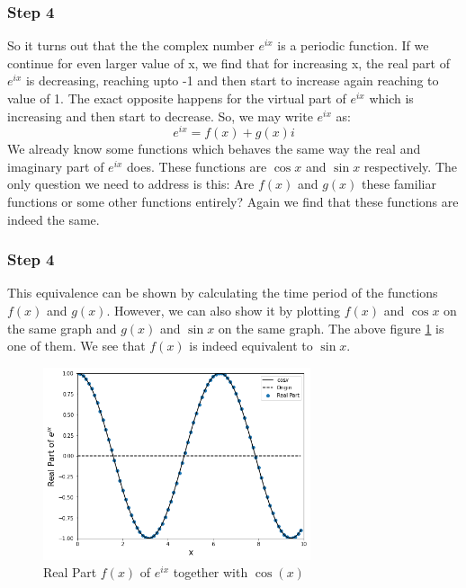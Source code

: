\documentclass{beamer}
\begin{document}
\begin{frame}
    \frametitle{Step 4}
    So it turns out that the the complex number $e^{ix}$ is a periodic function. If we continue for even larger value of x, we find that for increasing x, the real part of $e^{ix}$ is decreasing, reaching upto -1 and then start to increase again reaching to value of 1. The exact opposite happens for the virtual part of $e^{ix}$ which is increasing and then start to decrease.
    So, we may write $e^{ix}$ as: 
    \begin{equation}
        \label{eq:9}
        e^{ix} = f(x) + g(x)i
    \end{equation}
    \pause
    We already know some functions which behaves the same way the real and imaginary part of $e^{ix}$ does. These functions are $\cos{x}$ and $\sin{x}$ respectively. The only question we need to address is this: Are $f(x)$ and $g(x)$ these familiar functions or some other functions entirely? Again we find that these functions are indeed the same.
\end{frame}

\begin{frame}
    \frametitle{Step 4}
    This equivalence can be shown by calculating the time period of the functions $f(x)$ and $g(x)$. However, we can also show it by plotting $f(x)$ and $\cos{x}$ on the same graph and $g(x)$ and $\sin{x}$ on the same graph. The above figure \ref{fig:real} is one of them.
    We see that $f(x)$ is indeed equivalent to $\sin{x}$.
    \pause
    \begin{figure}
        \centering
        \includegraphics[width=0.7\textwidth, height=0.5\textheight]{img/real.png}
        \caption{\label{fig:real}Real Part $f(x)$ of $e^{ix}$ together with $\cos(x)$}
    \end{figure}
\end{frame}
\end{document}

